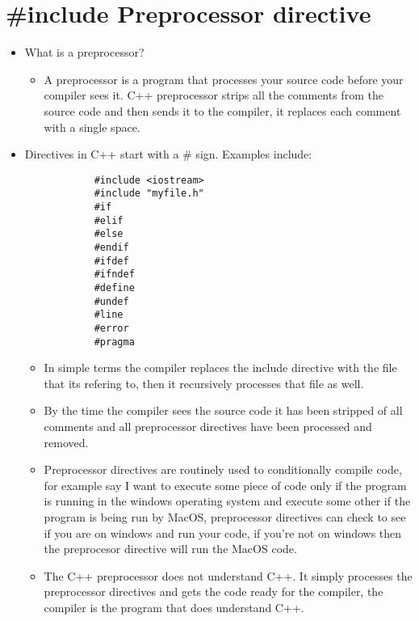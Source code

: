 \section{\#include Preprocessor directive}
\begin{itemize}
    \item What is a preprocessor?
        \begin{itemize}
            \item A preprocessor is a program that processes your source code before your compiler sees it. C++ preprocessor strips all the comments from the source code and then sends it to the compiler, it replaces each comment with a single space. 
        \end{itemize}
    
    \item Directives in C++ start with a \# sign. Examples include:
        \begin{verbatim}
            #include <iostream>
            #include "myfile.h"
            #if 
            #elif  
            #else 
            #endif  
            #ifdef 
            #ifndef  
            #define 
            #undef
            #line 
            #error 
            #pragma
        \end{verbatim}
        \begin{itemize}
            \item In simple terms the compiler replaces the include directive with the file that its refering to, then it recursively processes that file as well.
            \item By the time the compiler sees the source code it has been stripped of all comments and all preprocessor directives have been processed and removed. 
            \item Preprocessor directives are routinely used to conditionally compile code, for example say I want to execute some piece of code only if the program is running in the windows operating system and execute some other if the program is being run by MacOS, preprocessor directives can check to see if you are on windows and run your code, if you're not on windows then the preprocesor directive will run the MacOS code.
            \item The C++ preprocessor does not understand C++. It simply processes the preprocessor directives and gets the code ready for the compiler, the compiler is the program that does understand C++.
        \end{itemize}
\end{itemize}

